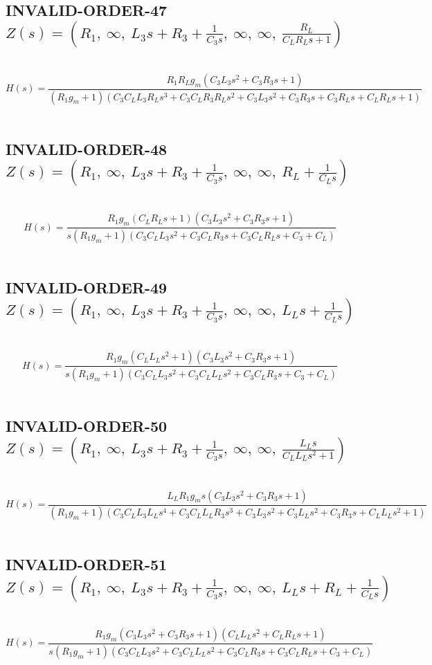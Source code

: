 \documentclass{article}
\begin{document}
\subsection{INVALID-ORDER-47 $Z(s) = \left( R_{1}, \  \infty, \  L_{3} s + R_{3} + \frac{1}{C_{3} s}, \  \infty, \  \infty, \  \frac{R_{L}}{C_{L} R_{L} s + 1}\right)$ } \ 
\textbf{\[H(s) = \frac{R_{1} R_{L} g_{m} \left(C_{3} L_{3} s^{2} + C_{3} R_{3} s + 1\right)}{\left(R_{1} g_{m} + 1\right) \left(C_{3} C_{L} L_{3} R_{L} s^{3} + C_{3} C_{L} R_{3} R_{L} s^{2} + C_{3} L_{3} s^{2} + C_{3} R_{3} s + C_{3} R_{L} s + C_{L} R_{L} s + 1\right)}\] } \ 
\subsection{INVALID-ORDER-48 $Z(s) = \left( R_{1}, \  \infty, \  L_{3} s + R_{3} + \frac{1}{C_{3} s}, \  \infty, \  \infty, \  R_{L} + \frac{1}{C_{L} s}\right)$ } \ 
\textbf{\[H(s) = \frac{R_{1} g_{m} \left(C_{L} R_{L} s + 1\right) \left(C_{3} L_{3} s^{2} + C_{3} R_{3} s + 1\right)}{s \left(R_{1} g_{m} + 1\right) \left(C_{3} C_{L} L_{3} s^{2} + C_{3} C_{L} R_{3} s + C_{3} C_{L} R_{L} s + C_{3} + C_{L}\right)}\] } \ 
\subsection{INVALID-ORDER-49 $Z(s) = \left( R_{1}, \  \infty, \  L_{3} s + R_{3} + \frac{1}{C_{3} s}, \  \infty, \  \infty, \  L_{L} s + \frac{1}{C_{L} s}\right)$ } \ 
\textbf{\[H(s) = \frac{R_{1} g_{m} \left(C_{L} L_{L} s^{2} + 1\right) \left(C_{3} L_{3} s^{2} + C_{3} R_{3} s + 1\right)}{s \left(R_{1} g_{m} + 1\right) \left(C_{3} C_{L} L_{3} s^{2} + C_{3} C_{L} L_{L} s^{2} + C_{3} C_{L} R_{3} s + C_{3} + C_{L}\right)}\] } \ 
\subsection{INVALID-ORDER-50 $Z(s) = \left( R_{1}, \  \infty, \  L_{3} s + R_{3} + \frac{1}{C_{3} s}, \  \infty, \  \infty, \  \frac{L_{L} s}{C_{L} L_{L} s^{2} + 1}\right)$ } \ 
\textbf{\[H(s) = \frac{L_{L} R_{1} g_{m} s \left(C_{3} L_{3} s^{2} + C_{3} R_{3} s + 1\right)}{\left(R_{1} g_{m} + 1\right) \left(C_{3} C_{L} L_{3} L_{L} s^{4} + C_{3} C_{L} L_{L} R_{3} s^{3} + C_{3} L_{3} s^{2} + C_{3} L_{L} s^{2} + C_{3} R_{3} s + C_{L} L_{L} s^{2} + 1\right)}\] } \ 
\subsection{INVALID-ORDER-51 $Z(s) = \left( R_{1}, \  \infty, \  L_{3} s + R_{3} + \frac{1}{C_{3} s}, \  \infty, \  \infty, \  L_{L} s + R_{L} + \frac{1}{C_{L} s}\right)$ } \ 
\textbf{\[H(s) = \frac{R_{1} g_{m} \left(C_{3} L_{3} s^{2} + C_{3} R_{3} s + 1\right) \left(C_{L} L_{L} s^{2} + C_{L} R_{L} s + 1\right)}{s \left(R_{1} g_{m} + 1\right) \left(C_{3} C_{L} L_{3} s^{2} + C_{3} C_{L} L_{L} s^{2} + C_{3} C_{L} R_{3} s + C_{3} C_{L} R_{L} s + C_{3} + C_{L}\right)}\] } \ 
\end{document}
